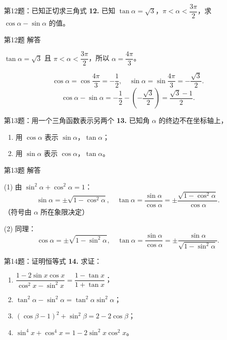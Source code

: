 \documentclass[10pt,aspectratio=169,serif]{beamer}
\begin{document}
\begin{frame}[t]{第12题：已知正切求三角式}
\textbf{12.} 已知 $\tan\alpha=\sqrt{3}$，$\pi<\alpha<\dfrac{3\pi}{2}$，求 $\cos\alpha-\sin\alpha$ 的值。
\end{frame}

\begin{frame}[t]{第12题 解答}
\begin{tcolorbox}[colback=orange!10,colframe=orange,title=\textbf{解}]
$\tan\alpha=\sqrt{3}$ 且 $\pi<\alpha<\dfrac{3\pi}{2}$，所以 $\alpha=\dfrac{4\pi}{3}$。

\vspace{0.5em}
\[
\cos\alpha=\cos\frac{4\pi}{3}=-\frac{1}{2},\quad
\sin\alpha=\sin\frac{4\pi}{3}=-\frac{\sqrt{3}}{2}.
\]
\[
\cos\alpha-\sin\alpha = -\frac{1}{2}-\left(-\frac{\sqrt{3}}{2}\right)
= \frac{\sqrt{3}-1}{2}.
\]
\end{tcolorbox}
\end{frame}

\begin{frame}[t]{第13题：用一个三角函数表示另两个}
\textbf{13.} 已知角 $\alpha$ 的终边不在坐标轴上，
\begin{enumerate}
  \item 用 $\cos\alpha$ 表示 $\sin\alpha$，$\tan\alpha$；
  \item 用 $\sin\alpha$ 表示 $\cos\alpha$，$\tan\alpha$。
\end{enumerate}
\end{frame}

\begin{frame}[t]{第13题 解答}
\begin{tcolorbox}[colback=orange!10,colframe=orange,title=\textbf{解}]
(1) 由 $\sin^2\alpha+\cos^2\alpha=1$：
\[
\sin\alpha=\pm\sqrt{1-\cos^2\alpha},\quad
\tan\alpha=\frac{\sin\alpha}{\cos\alpha}=\pm\frac{\sqrt{1-\cos^2\alpha}}{\cos\alpha}.
\]
（符号由 $\alpha$ 所在象限决定）

(2) 同理：
\[
\cos\alpha=\pm\sqrt{1-\sin^2\alpha},\quad
\tan\alpha=\frac{\sin\alpha}{\cos\alpha}=\pm\frac{\sin\alpha}{\sqrt{1-\sin^2\alpha}}.
\]
\end{tcolorbox}
\end{frame}

\begin{frame}[t]{第14题：证明恒等式}
\textbf{14.} 求证：
\begin{enumerate}
  \item $\dfrac{1-2\sin x\cos x}{\cos^2 x-\sin^2 x}=\dfrac{1-\tan x}{1+\tan x}$；
  \item $\tan^2\alpha-\sin^2\alpha=\tan^2\alpha\sin^2\alpha$；
  \item $(\cos\beta-1)^2+\sin^2\beta=2-2\cos\beta$；
  \item $\sin^4 x+\cos^4 x=1-2\sin^2 x\cos^2 x$。
\end{enumerate}
\end{frame}
\end{document}
